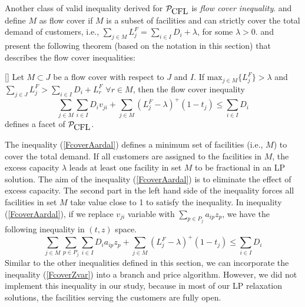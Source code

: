 Another class of valid inequality derived for $\mathcal{P}_{\mbox{CFL}}$ is {\em flow cover inequality}.
\citet{Aardal} and \citet{Padberg} define $M$ as flow cover if $M$ is a subset of
facilities and can strictly cover the total demand of customers, i.e.,
$\sum_{j \in M}L^F_j = \sum_{i \in I}D_i + \lambda$, for some $\lambda > 0$.
\citet{Aardal} and \citet{Padberg} present the following theorem
(based on the notation in this section) that describes the flow cover
inequalities:
\begin{thm}
\label{thm-fwcover}
[\citet{Aardal}]
Let $M \subset J $ be a flow cover with respect to $J$ and $I$.
If $\mbox{max}_{j \in M}\{L^F_j\} > \lambda$ and
$\sum_{j \in J}L^F_j > \sum_{i \in I}D_i + L^F_r$ $\forall r \in M$, then
the flow cover inequality
\begin{equation}
\label{FcoverAardal}
\sum_{j \in M}\sum_{i \in I}D_i v_{ji}+\sum_{j \in M}(L^F_j-\lambda)^+(1-t_j) \leq \sum_{i \in I}D_i
\end{equation}
defines a facet of $\mathcal{P}_{\mbox{CFL}}$.
\end{thm}
The inequality (\ref{FcoverAardal}) defines a minimum set of facilities (i.e., $M$)
to cover the total demand. If all customers are assigned to the facilities in $M$, the
excess capacity $\lambda$ leads at least one facility in set $M$ to be fractional in an LP
solution. The aim of the inequality (\ref{FcoverAardal}) is to eliminate the effect of
excess capacity. The second part in the left hand side of the inequality
forces all facilities in set $M$ take value close to 1 to satisfy the inequality.
In inequality (\ref{FcoverAardal}), if we replace $v_{ji}$ variable with
$\sum_{p \in P_j}a_{ip}z_{p}$, we have the following inequality in $(t,z)$
space.
\begin{equation}
\label{FcoverZvar}
\sum_{j \in M}\sum_{p \in P_j}\sum_{i \in I}D_i a_{ip}z_p + \sum_{j \in M}(L^F_j-\lambda)^+(1-t_j) \leq \sum_{i \in I}D_i
\end{equation}
Similar to the other inequalities defined in this section, we can incorporate the inequality
(\ref{FcoverZvar}) into a branch and price algorithm. However, we did not implement this
inequality in our study, because in most of our LP relaxation solutions, the facilities
serving the customers are fully open.

